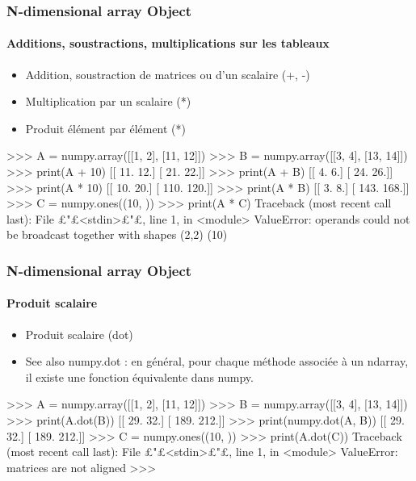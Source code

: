 \begin{frame}[fragile]
\frametitle{N-dimensional array Object}
\framesubtitle{Additions, soustractions, multiplications sur les tableaux}
\begin{itemize}
 \item Addition, soustraction de matrices ou d'un scalaire (+, -)
 \item Multiplication par un scalaire (*)
 \item Produit élément par élément (*) 
\end{itemize}
\begin{pythonConsole}
>>> A = numpy.array([[1, 2], [11, 12]])
>>> B = numpy.array([[3, 4], [13, 14]])
>>> print(A + 10)
[[ 11.  12.]
 [ 21.  22.]]
>>> print(A + B)
[[  4.   6.]
 [ 24.  26.]]
>>> print(A * 10)
[[  10.   20.]
 [ 110.  120.]]
>>> print(A * B)
[[   3.    8.]
 [ 143.  168.]]
>>> C = numpy.ones((10, ))
>>> print(A * C)
Traceback (most recent call last):
  File £"£<stdin>£"£, line 1, in <module>
ValueError: operands could not be broadcast together with shapes (2,2) (10) 
\end{pythonConsole}
\end{frame}
\begin{frame}[fragile]
\frametitle{N-dimensional array Object}
\framesubtitle{Produit scalaire}
\begin{itemize}
 \item Produit scalaire (dot)
 \item See also numpy.dot : en général, pour chaque méthode associée à un ndarray, il existe une fonction équivalente dans numpy. 
\end{itemize}
\begin{pythonConsole}
>>> A = numpy.array([[1, 2], [11, 12]])
>>> B = numpy.array([[3, 4], [13, 14]])
>>> print(A.dot(B))
[[  29.   32.]
 [ 189.  212.]]
>>> print(numpy.dot(A, B))
[[  29.   32.]
 [ 189.  212.]]
>>> C = numpy.ones((10, ))
>>> print(A.dot(C))
Traceback (most recent call last):
  File £"£<stdin>£"£, line 1, in <module>
ValueError: matrices are not aligned
>>> 
\end{pythonConsole}
\end{frame}

